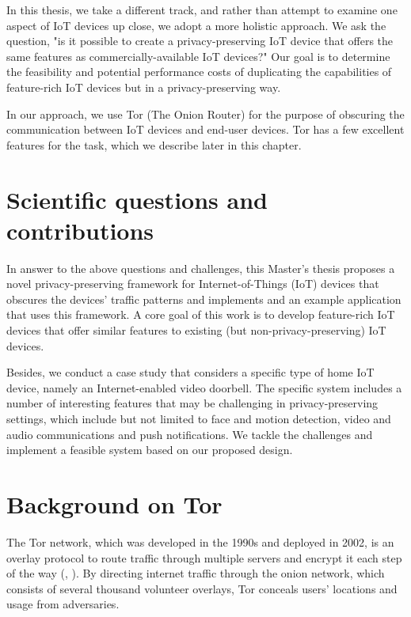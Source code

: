In this thesis, we take a different track, and rather than attempt to examine one aspect of IoT devices up close, we adopt a more holistic approach. We ask the question, "is it possible to create a privacy-preserving IoT device that offers the same features as commercially-available IoT devices?" Our goal is to determine the feasibility and potential performance costs of duplicating the capabilities of feature-rich IoT devices but in a privacy-preserving way.

In our approach, we use Tor (The Onion Router) for the purpose of obscuring the communication between IoT devices and end-user devices. Tor has a few excellent features for the task, which we describe later in this chapter.

\section{Scientific questions and contributions}

In answer to the above questions and challenges, this Master's thesis proposes a novel privacy-preserving framework for Internet-of-Things (IoT) devices that obscures the devices' traffic patterns and implements and an example application that uses this framework. A core goal of this work is to develop feature-rich IoT devices that offer similar features to existing (but non-privacy-preserving) IoT devices.

Besides, we conduct a case study that considers a specific type of home IoT device, namely an Internet-enabled video doorbell. The specific system includes a number of interesting features that may be challenging in privacy-preserving settings, which include but not limited to face and motion detection, video and audio communications and push notifications. We tackle the challenges and implement a feasible system based on our proposed design.

\section{Background on Tor}
\label{sec:torbackground}
The Tor network, which was developed in the 1990s and deployed in 2002, is an overlay protocol to route traffic through multiple servers and encrypt it each step of the way (\cite{torproject}, \cite{chaabane2010digging}). By directing internet traffic through the onion network, which consists of several thousand volunteer overlays, Tor conceals users' locations and usage from adversaries.

